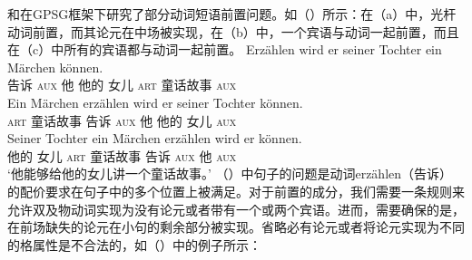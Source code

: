 \citet{Nerbonne86a}和\citet{Johnson86a}在GPSG框架下研究了部分动词短语前置问题。如（）所示：在（a）中，光杆动词前置，而其论元在中场被实现，在（b）中，一个宾语与动词一起前置，而且在（c）中所有的宾语都与动词一起前置。
\eal
\ex 
\gll Erzählen wird er seiner Tochter ein Märchen können.\\
     告诉  \textsc{aux} 他 他的 女儿 \textsc{art} 童话故事 \textsc{aux}\\
\ex 
\gll Ein Märchen erzählen wird er seiner Tochter können.\\
     \textsc{art} 童话故事 告诉 \textsc{aux} 他 他的 女儿 \textsc{aux}\\
\ex 
\gll Seiner Tochter ein Märchen erzählen wird er können.\\
     他的 女儿 \textsc{art} 童话故事 告诉 \textsc{aux} 他 \textsc{aux}\\
\glt `他能够给他的女儿讲一个童话故事。'
\zl
（）中句子的问题是动词erzählen（告诉）的配价要求在句子中的多个位置上被满足。对于前置的成分，我们需要一条规则来允许双及物动词实现为没有论元或者带有一个或两个宾语。进而，需要确保的是，在前场缺失的论元在小句的剩余部分被实现。省略必有论元或者将论元实现为不同的格属性是不合法的，如（）中的例子所示：
